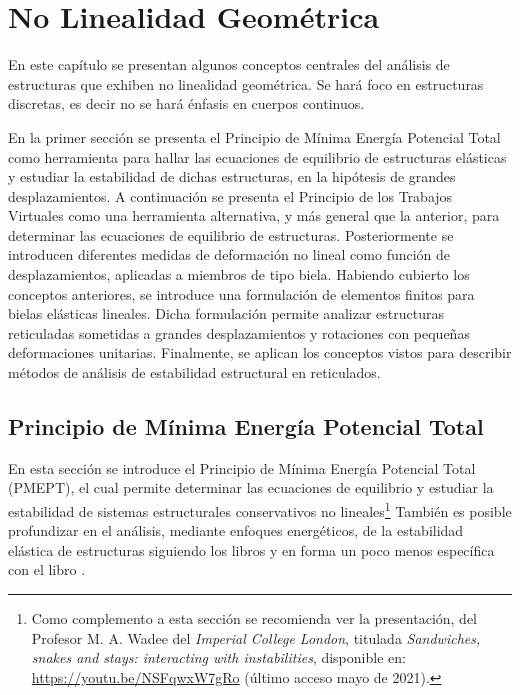 \chapter{No Linealidad Geométrica}\label{cap2GNA}

En este capítulo se presentan algunos conceptos centrales del análisis de estructuras que exhiben no linealidad geométrica. Se hará foco en estructuras discretas, es decir no se hará énfasis en cuerpos continuos.

En la primer sección se presenta el Principio de Mínima Energía Potencial Total como herramienta para hallar las ecuaciones de equilibrio de estructuras elásticas y estudiar la estabilidad de dichas estructuras, en la hipótesis de grandes desplazamientos. %
%
A continuación se presenta el Principio de los Trabajos Virtuales como una herramienta alternativa, y más general que la anterior, para determinar las ecuaciones de equilibrio de estructuras. %
% 
Posteriormente se introducen diferentes medidas de deformación no lineal como función de desplazamientos, aplicadas a miembros de tipo biela. %
%
Habiendo cubierto los conceptos anteriores, se introduce una formulación de elementos finitos para bielas elásticas lineales. %
%
Dicha formulación permite analizar estructuras reticuladas sometidas a grandes desplazamientos y rotaciones con pequeñas deformaciones unitarias. %
%
Finalmente, se aplican los conceptos vistos para describir métodos de análisis de estabilidad estructural en reticulados.




\section{Principio de Mínima Energía Potencial Total}

En esta sección se introduce el Principio de Mínima Energía Potencial Total (PMEPT), el cual permite determinar las ecuaciones de equilibrio y estudiar la estabilidad de sistemas estructurales conservativos no lineales\footnote{Como complemento a esta sección se recomienda ver la presentación, del Profesor M. A. Wadee del \textit{Imperial College London}, titulada \textit{Sandwiches, snakes and stays: interacting with instabilities}, disponible en: \href{https://youtu.be/NSFqwxW7gRo}{https://youtu.be/NSFqwxW7gRo} (último acceso mayo de 2021).}
%
También es posible profundizar en el análisis, mediante enfoques energéticos, de la estabilidad elástica de estructuras siguiendo los libros \citep{thompson1973general,Crisfield1997} y en forma un poco menos específica con el libro \citep{timoshenko2012theory}.

